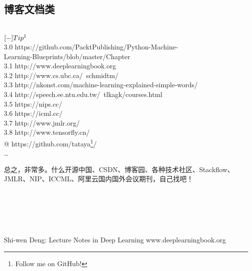 \documentclass[UFT8]{ctexart}
\begin{document}
\subsection{博客文档类}
~\\
$[-]Tip\footnote{You can find this article on my GitHub!} $\\
3.0	https://github.com/PacktPublishing/Python-Machine-\\
Learning-Blueprints/blob/master/Chapter \\
3.1	http://www.deeplearningbook.org  \\
3.2	http://www.cs.ubc.ca/~schmidtm/ \\ 
3.3	http://nkonst.com/machine-learning-explained-simple-words/ \\
3.4	http://speech.ee.ntu.edu.tw/~tlkagk/courses.html  \\
3.5	https://nips.cc/ \\
3.6	https://icml.cc/ \\
3.7	http://www.jmlr.org/ \\
3.8	http://www.tensorfly.cn/ \\
@	https://github.com/tataya\footnote{Follow me on GitHub!}/  \\
\ldots
\begin{center}
总之，非常多。什么开源中国、CSDN、博客园、各种技术社区、Stackflow、JMLR、NIP、ICCML、阿里云国内国外会议期刊，自己找吧！\\
\end{center}
~\\
~\\
~\\
~\\
\begin{thebibliography}{99}
\bibitem{}Shi-wen Deng:
Lecture Notes in Deep Learning
\bibitem{} www.deeplearningbook.org
\end{thebibliography}
\end{document}
